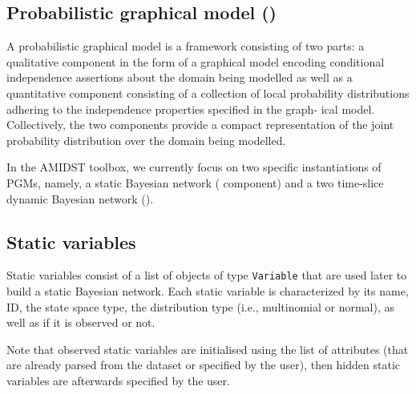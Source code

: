 \subsection{Probabilistic graphical model ()}

 A probabilistic graphical model is a framework consisting of two parts: a qualitative component in the form of a graphical model encoding conditional independence assertions about the domain being modelled as well as a quantitative component consisting of a collection of local probability distributions adhering to the independence properties specified in the graph- ical model. Collectively, the two components provide a compact representation of the joint probability distribution over the domain being modelled.
 
In the AMIDST toolbox, we currently focus on two specific instantiations of PGMs, namely, a static Bayesian network ( component) and a two time-slice dynamic Bayesian network (). 
 

\subsection{Static variables}

Static variables consist of a list of objects of type \texttt{Variable} that are used later to build a static Bayesian network. Each static variable is characterized by its name, ID, the state space type, the distribution type (i.e., multinomial or normal), as well as if it is observed or not. 

Note that observed static variables are initialised using the list of attributes (that are already parsed from the dataset or specified by the user), then hidden static variables are afterwards specified by the user.

